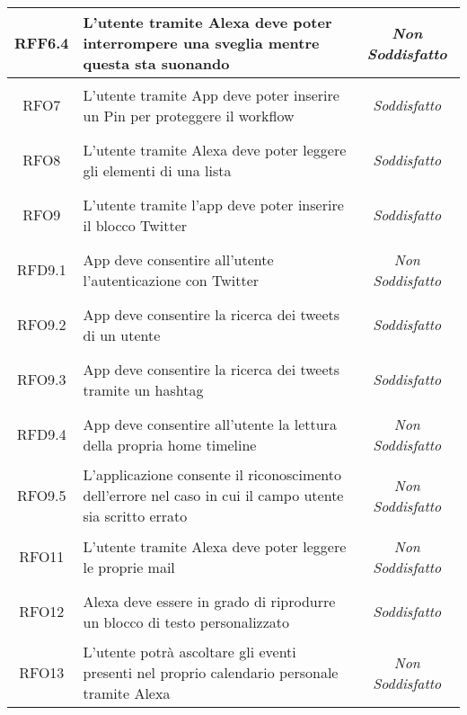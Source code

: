 \begin{longtable}{|c|>{\centering}m{7cm}|c|}
	\hypertarget{RFF6.4}{RFF6.4} & L'utente tramite Alexa deve poter interrompere una sveglia mentre questa sta suonando & \textit{Non Soddisfatto}\\ \hline
	
	\hypertarget{RFO7}{RFO7} & L'utente tramite App deve poter inserire un Pin per proteggere il workflow & \textit{Soddisfatto}\\ \hline
	
	\hypertarget{RFO8}{RFO8} & L'utente tramite Alexa deve poter leggere gli elementi di una lista & \textit{Soddisfatto}\\ \hline
	
	\hypertarget{RFO9}{RFO9} & L'utente tramite l'app deve poter inserire il blocco Twitter & \textit{Soddisfatto}\\ \hline
	
	\hypertarget{RFD9.1}{RFD9.1} & App deve consentire all'utente l'autenticazione con Twitter  & \textit{Non Soddisfatto}\\ \hline
	
	\hypertarget{RFO9.2}{RFO9.2} & App deve consentire la ricerca dei tweets di un utente & \textit{Soddisfatto}\\ \hline
	
	\hypertarget{RFO9.3}{RFO9.3} & App deve consentire la ricerca dei tweets tramite un hashtag & \textit{Soddisfatto}\\ \hline
	
	\hypertarget{RFD9.4}{RFD9.4} & App deve consentire all'utente la lettura della propria home timeline & \textit{Non Soddisfatto}\\ \hline
	
	\hypertarget{RFO9.5}{RFO9.5} & L'applicazione consente il riconoscimento dell'errore nel caso in cui il campo utente sia scritto errato & \textit{Non Soddisfatto}\\ \hline
	
	\hypertarget{RFO11}{RFO11} & L'utente tramite Alexa deve poter leggere le proprie mail & \textit{Non Soddisfatto}\\ \hline
	
	\hypertarget{RFO12}{RFO12} & Alexa deve essere in grado di riprodurre un blocco di testo personalizzato & \textit{Soddisfatto}\\ \hline
	
	\hypertarget{RFO13}{RFO13} & L'utente potrà ascoltare gli eventi presenti nel proprio calendario personale tramite Alexa & \textit{Non Soddisfatto}\\ \hline
	

\end{longtable}
